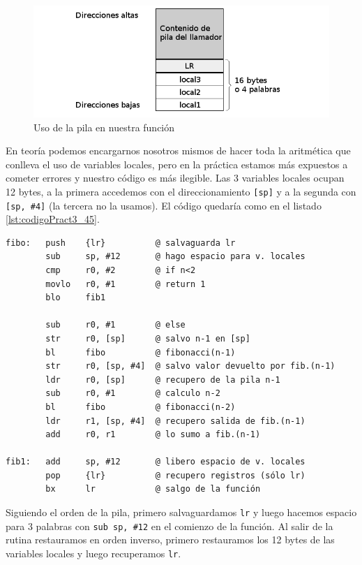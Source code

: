\begin{figure}[h]
  \centering
    \includegraphics[width=14cm]{graphs/pila2.png}
  \caption{Uso de la pila en nuestra función}
  \label{fig:pila2}
\end{figure}

En teoría podemos encargarnos nosotros mismos de hacer toda la aritmética que conlleva el
uso de variables locales, pero en la práctica estamos más expuestos a cometer errores y
nuestro código es más ilegible. Las 3 variables locales ocupan 12 bytes, a la primera
accedemos con el direccionamiento {\tt [sp]} y a la segunda con {\tt [sp, \#4]} (la tercera
no la usamos). El código quedaría como en el listado \ref{lst:codigoPract3_45}.

\begin{lstlisting}[caption={Función recursiva fibo (en subrut3.s)},label={lst:codigoPract3_45}]
fibo:   push    {lr}          @ salvaguarda lr
        sub     sp, #12       @ hago espacio para v. locales
        cmp     r0, #2        @ if n<2
        movlo   r0, #1        @ return 1
        blo     fib1

        sub     r0, #1        @ else
        str     r0, [sp]      @ salvo n-1 en [sp]
        bl      fibo          @ fibonacci(n-1)
        str     r0, [sp, #4]  @ salvo valor devuelto por fib.(n-1)
        ldr     r0, [sp]      @ recupero de la pila n-1
        sub     r0, #1        @ calculo n-2
        bl      fibo          @ fibonacci(n-2)
        ldr     r1, [sp, #4]  @ recupero salida de fib.(n-1)
        add     r0, r1        @ lo sumo a fib.(n-1)

fib1:   add     sp, #12       @ libero espacio de v. locales
        pop     {lr}          @ recupero registros (sólo lr)
        bx      lr            @ salgo de la función
\end{lstlisting}

Siguiendo el orden de la pila, primero salvaguardamos {\tt lr} y luego hacemos espacio para
3 palabras con {\tt sub sp, \#12} en el comienzo de la función. Al salir de la rutina
restauramos en orden inverso, primero restauramos los 12 bytes de las variables locales
y luego recuperamos {\tt lr}.

